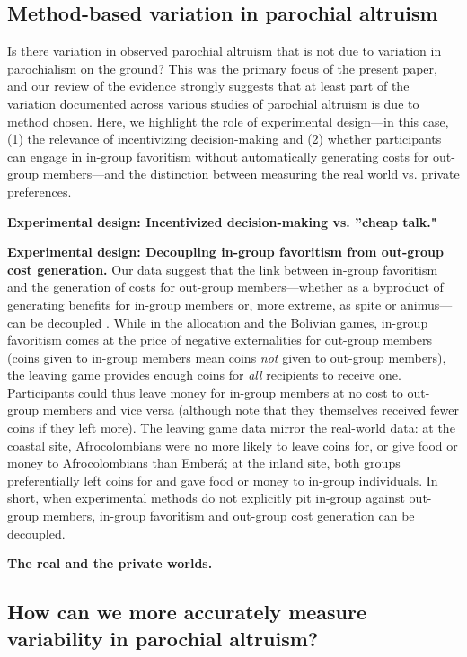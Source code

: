 \documentclass[bibauthoryear]{aa}
\begin{document}
\subsection{Method-based variation in parochial altruism}

Is there variation in observed parochial altruism that is not due to variation in parochialism on the ground? This was the primary focus of the present paper, and our review of the evidence strongly suggests that at least part of the variation documented across various studies of parochial altruism is due to method chosen. Here, we highlight the role of experimental design---in this case, (1) the relevance of incentivizing decision-making and (2) whether participants can engage in in-group favoritism without automatically generating costs for out-group members---and the distinction between measuring the real world vs. private preferences.

\textbf{Experimental design: Incentivized decision-making vs. ''cheap talk."} 

\textbf{Experimental design: Decoupling in-group favoritism from out-group cost generation.} Our data suggest that the link between in-group favoritism and the generation of costs for out-group members---whether as a byproduct of generating benefits for in-group members or, more extreme, as spite or animus---can be decoupled \citep[see also][]{cashdan2001ethnocentrism, hruschka2013economic, schaub2017threat, yamagishi2016parochial}. While in the allocation and the Bolivian games, in-group favoritism comes at the price of negative externalities for out-group members (coins given to in-group members mean coins \emph{not} given to out-group members), the leaving game provides enough coins for \emph{all} recipients to receive one. Participants could thus leave money for in-group members at no cost to out-group members and vice versa (although note that they themselves received fewer coins if they left more). The leaving game data mirror the real-world data: at the coastal site, Afrocolombians were no more likely to leave coins for, or give food or money to Afrocolombians than Ember\'a; at the inland site, both groups preferentially left coins for and gave food or money to in-group individuals. In short, when experimental methods do not explicitly pit in-group against out-group members, in-group favoritism and out-group cost generation can be decoupled.

\textbf{The real and the private worlds.}

\subsection{How can we more accurately measure variability in parochial altruism?}
\end{document}
